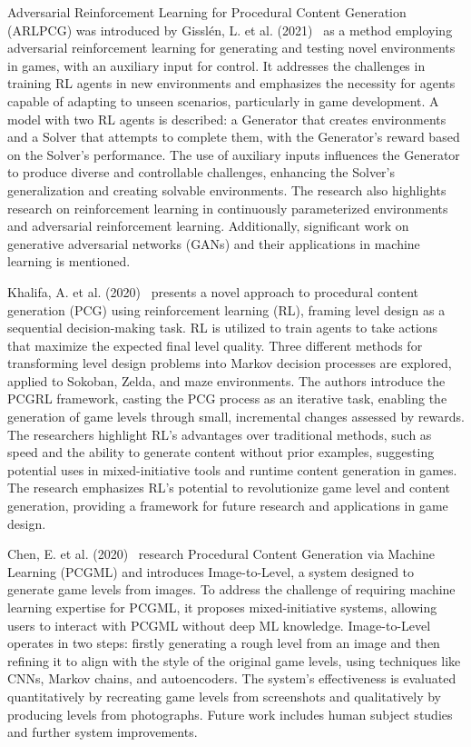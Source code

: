 \documentclass[runningheads]{llncs}
\begin{document}
Adversarial Reinforcement Learning for Procedural Content Generation (ARLPCG) was introduced by Gisslén, L. et al. (2021)~\cite{ref_article26} as a method employing adversarial reinforcement learning for generating and testing novel environments in games, with an auxiliary input for control. It addresses the challenges in training RL agents in new environments and emphasizes the necessity for agents capable of adapting to unseen scenarios, particularly in game development. A model with two RL agents is described: a Generator that creates environments and a Solver that attempts to complete them, with the Generator's reward based on the Solver's performance. The use of auxiliary inputs influences the Generator to produce diverse and controllable challenges, enhancing the Solver's generalization and creating solvable environments. The research also highlights research on reinforcement learning in continuously parameterized environments and adversarial reinforcement learning. Additionally, significant work on generative adversarial networks (GANs) and their applications in machine learning is mentioned.

Khalifa, A. et al. (2020)~\cite{ref_article27} presents a novel approach to procedural content generation (PCG) using reinforcement learning (RL), framing level design as a sequential decision-making task. RL is utilized to train agents to take actions that maximize the expected final level quality. Three different methods for transforming level design problems into Markov decision processes are explored, applied to Sokoban, Zelda, and maze environments. The authors introduce the PCGRL framework, casting the PCG process as an iterative task, enabling the generation of game levels through small, incremental changes assessed by rewards. The researchers highlight RL's advantages over traditional methods, such as speed and the ability to generate content without prior examples, suggesting potential uses in mixed-initiative tools and runtime content generation in games. The research emphasizes RL's potential to revolutionize game level and content generation, providing a framework for future research and applications in game design.

Chen, E. et al. (2020)~\cite{ref_article11} research Procedural Content Generation via Machine Learning (PCGML) and introduces Image-to-Level, a system designed to generate game levels from images. To address the challenge of requiring machine learning expertise for PCGML, it proposes mixed-initiative systems, allowing users to interact with PCGML without deep ML knowledge. Image-to-Level operates in two steps: firstly generating a rough level from an image and then refining it to align with the style of the original game levels, using techniques like CNNs, Markov chains, and autoencoders. The system's effectiveness is evaluated quantitatively by recreating game levels from screenshots and qualitatively by producing levels from photographs. Future work includes human subject studies and further system improvements.
\end{document}
